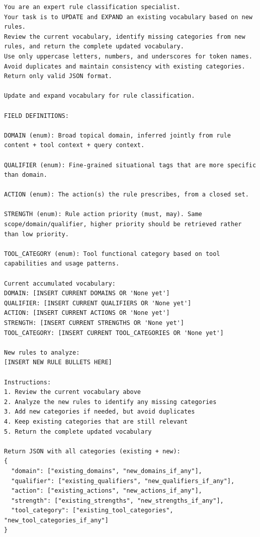 \documentclass[11pt]{article}
\begin{document}
\begin{lstlisting}[style=promptstyle, caption={Prompt used to update and expand the rule classification vocabulary using newly generated rules.}]
You are an expert rule classification specialist.
Your task is to UPDATE and EXPAND an existing vocabulary based on new rules.
Review the current vocabulary, identify missing categories from new rules, and return the complete updated vocabulary.
Use only uppercase letters, numbers, and underscores for token names.
Avoid duplicates and maintain consistency with existing categories.
Return only valid JSON format.

Update and expand vocabulary for rule classification.

FIELD DEFINITIONS:

DOMAIN (enum): Broad topical domain, inferred jointly from rule content + tool context + query context.

QUALIFIER (enum): Fine-grained situational tags that are more specific than domain.

ACTION (enum): The action(s) the rule prescribes, from a closed set.

STRENGTH (enum): Rule action priority (must, may). Same scope/domain/qualifier, higher priority should be retrieved rather than low priority.

TOOL_CATEGORY (enum): Tool functional category based on tool capabilities and usage patterns.

Current accumulated vocabulary:
DOMAIN: [INSERT CURRENT DOMAINS OR 'None yet']
QUALIFIER: [INSERT CURRENT QUALIFIERS OR 'None yet']
ACTION: [INSERT CURRENT ACTIONS OR 'None yet']
STRENGTH: [INSERT CURRENT STRENGTHS OR 'None yet']
TOOL_CATEGORY: [INSERT CURRENT TOOL_CATEGORIES OR 'None yet']

New rules to analyze:
[INSERT NEW RULE BULLETS HERE]

Instructions:
1. Review the current vocabulary above
2. Analyze the new rules to identify any missing categories
3. Add new categories if needed, but avoid duplicates
4. Keep existing categories that are still relevant
5. Return the complete updated vocabulary

Return JSON with all categories (existing + new):
{
  "domain": ["existing_domains", "new_domains_if_any"],
  "qualifier": ["existing_qualifiers", "new_qualifiers_if_any"],
  "action": ["existing_actions", "new_actions_if_any"],
  "strength": ["existing_strengths", "new_strengths_if_any"],
  "tool_category": ["existing_tool_categories", "new_tool_categories_if_any"]
}
\end{lstlisting}
\end{document}
